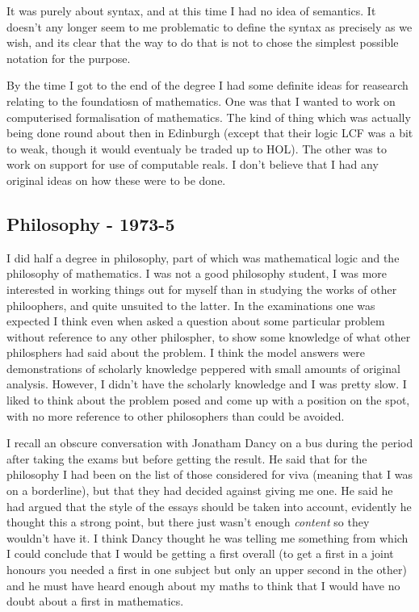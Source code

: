 \documentclass{rbjk}
\begin{document}
\begin{article}
It was purely about syntax, and at this time I had no idea of semantics.
It doesn't any longer seem to me problematic to define the syntax as precisely as we wish, and its clear that the way to do that is not to chose the simplest possible notation for the purpose.

By the time I got to the end of the degree I had some definite ideas for reasearch relating to the foundatiosn of mathematics.
One was that I wanted to work on computerised formalisation of mathematics.
The kind of thing which was actually being done round about then in Edinburgh (except that their logic LCF was a bit to weak, though it would eventualy be traded up to HOL).
The other was to work on support for use of computable reals.
I don't believe that I had any original ideas on how these were to be done.

\subsection{Philosophy - 1973-5}

I did half a degree in philosophy, part of which was mathematical logic and the philosophy of mathematics.
I was not a good philosophy student, I was more interested in working things out for myself than in studying the works of other philoophers, and quite unsuited to the latter.
In the examinations one was expected I think even when asked a question about some particular problem without reference to any other philospher, to show some knowledge of what other philosphers had said about the problem.
I think the model answers were demonstrations of scholarly knowledge peppered with small amounts of original analysis.
However, I didn't have the scholarly knowledge and I was pretty slow.
I liked to think about the problem posed and come up with a position on the spot, with no more reference to other philosophers than could be avoided.

I recall an obscure conversation with Jonatham Dancy on a bus during the period after taking the exams but before getting the result.
He said that for the philosophy I had been on the list of those considered for viva (meaning that I was on a borderline), but that they had decided against giving me one.
He said he had argued that the style of the essays should be taken into account, evidently he thought this a strong point, but there just wasn't enough {\it content} so they wouldn't have it.
I think Dancy thought he was telling me something from which I could conclude that I would be getting a first overall (to get a first in a joint honours you needed a first in one subject but only an upper second in the other) and he must have heard enough about my maths to think that I would have no doubt about a first in mathematics.


\end{article}
\end{document}
